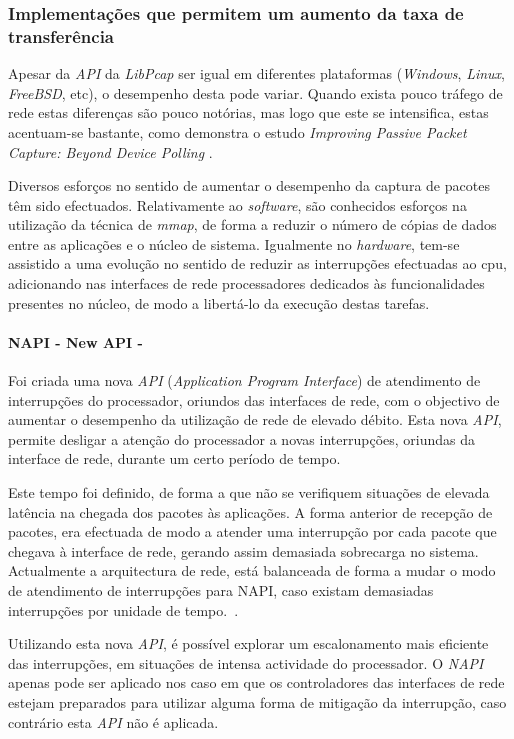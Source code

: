 \subsubsection{Implementações que permitem um aumento da taxa de transferência}

Apesar da \textit{API} da \textit{LibPcap} ser igual em diferentes plataformas (\textit{Windows}, \textit{Linux}, \textit{FreeBSD}, etc), o desempenho desta pode variar.
Quando exista pouco tráfego de rede estas diferenças são pouco notórias, mas logo que este se intensifica, estas acentuam-se bastante, como demonstra o estudo \textit{Improving Passive Packet Capture: Beyond Device Polling} \cite{Deri2004}.

Diversos esforços no sentido de aumentar o desempenho da captura de pacotes têm sido efectuados.
Relativamente ao \textit{software}, são conhecidos esforços na utilização da técnica de \textit{mmap}, de forma a reduzir o número de cópias de dados entre as aplicações e o núcleo de sistema.
Igualmente no \textit{hardware}, tem-se assistido a uma evolução no sentido de reduzir as interrupções efectuadas ao cpu, adicionando nas interfaces de rede processadores dedicados às funcionalidades presentes no núcleo, de modo a libertá-lo da execução destas tarefas.

\paragraph*{NAPI - New API - }

Foi criada uma nova \textit{API} (\textit{Application Program Interface}) de atendimento de interrupções do processador, oriundos das interfaces de rede, com o objectivo de aumentar o desempenho da utilização de rede de elevado débito.
Esta nova \textit{API}, permite desligar a atenção do processador a novas interrupções, oriundas da interface de rede, durante um certo período de tempo.

Este tempo foi definido, de forma a que não se verifiquem situações de elevada latência na chegada dos pacotes às aplicações.
A forma anterior de recepção de pacotes, era efectuada de modo a atender uma interrupção por cada pacote que chegava à interface de rede, gerando assim demasiada sobrecarga no sistema.
Actualmente a arquitectura de rede, está balanceada de forma a mudar o modo de atendimento de interrupções para NAPI, caso existam demasiadas interrupções por unidade de tempo.~\cite{administrator:napi}.

Utilizando esta nova \textit{API}, é possível explorar um escalonamento mais eficiente das interrupções, em situações de intensa actividade do processador.
O \textit{NAPI} apenas pode ser aplicado nos caso em que os controladores das interfaces de rede estejam preparados para utilizar alguma forma de mitigação da interrupção, caso contrário esta \textit{API} não é aplicada.

